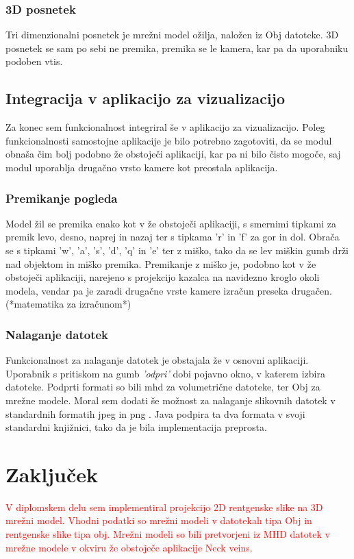\documentclass[a4paper, 12pt]{book}
\begin{document}
\subsection*{3D posnetek}

Tri dimenzionalni posnetek je mrežni model ožilja, naložen iz Obj datoteke. 3D posnetek se sam po sebi ne premika, premika se le kamera, kar pa da uporabniku podoben vtis.

\section{Integracija v aplikacijo za vizualizacijo}

Za konec sem funkcionalnost integriral še v aplikacijo za vizualizacijo. Poleg funkcionalnosti samostojne aplikacije je bilo potrebno zagotoviti, da se modul obnaša čim bolj podobno že obstoječi aplikaciji, kar pa ni bilo čisto mogoče, saj modul uporablja drugačno vrsto kamere kot preostala aplikacija. 

\subsection*{Premikanje pogleda}

Model žil se premika enako kot v že obstoječi aplikaciji, s smernimi tipkami za premik levo, desno, naprej in nazaj ter s tipkama 'r' in 'f' za gor in dol. Obrača se s tipkami 'w', 'a', 's', 'd', 'q' in 'e' ter z miško, tako da se lev miškin gumb drži nad objektom in miško premika. Premikanje z miško je, podobno kot v že obstoječi aplikaciji, narejeno s projekcijo kazalca na navidezno kroglo okoli modela, vendar pa je zaradi drugačne vrste kamere izračun preseka drugačen. (*matematika za izračunom*) 


\subsection*{Nalaganje datotek}
Funkcionalnost za nalaganje datotek je obstajala že v osnovni aplikaciji. Uporabnik s pritiskom na gumb \emph{'odpri'} dobi pojavno okno, v katerem izbira datoteke. Podprti formati so bili mhd za volumetrične datoteke, ter Obj za mrežne modele. Moral sem dodati še možnost za nalaganje slikovnih datotek v standardnih formatih jpeg in png \cite{png}. Java podpira ta dva formata v svoji standardni knjižnici, tako da je bila implementacija preprosta.

\chapter{Zaključek}
\textcolor{red}{V diplomskem delu sem implementiral projekcijo 2D rentgenske slike na 3D mrežni model. Vhodni podatki so mrežni modeli v datotekah tipa Obj in rentgenske slike tipa obj. Mrežni modeli so bili pretvorjeni iz MHD datotek v mrežne modele v okviru že obstoječe aplikacije Neck veins.
}
\end{document}
